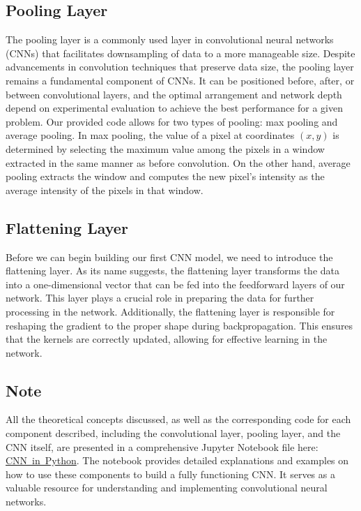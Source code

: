 \documentclass[onecolumn,10pt,cleanfoot]{asme2ej}
\begin{document}
\subsection{Pooling Layer}
The pooling layer is a commonly used layer in convolutional neural networks (CNNs) that facilitates downsampling of data to a more manageable size. Despite advancements in convolution techniques that preserve data size, the pooling layer remains a fundamental component of CNNs. It can be positioned before, after, or between convolutional layers, and the optimal arrangement and network depth depend on experimental evaluation to achieve the best performance for a given problem. Our provided code allows for two types of pooling: max pooling and average pooling. In max pooling, the value of a pixel at coordinates $(x,y)$ is determined by selecting the maximum value among the pixels in a window extracted in the same manner as before convolution. On the other hand, average pooling extracts the window and computes the new pixel's intensity as the average intensity of the pixels in that window.

\subsection{Flattening Layer}
Before we can begin building our first CNN model, we need to introduce the flattening layer. As its name suggests, the flattening layer transforms the data into a one-dimensional vector that can be fed into the feedforward layers of our network. This layer plays a crucial role in preparing the data for further processing in the network. Additionally, the flattening layer is responsible for reshaping the gradient to the proper shape during backpropagation. This ensures that the kernels are correctly updated, allowing for effective learning in the network.

\subsection{Note}
All the theoretical concepts discussed, as well as the corresponding code for each component described, including the convolutional layer, pooling layer, and the CNN itself, are presented in a comprehensive Jupyter Notebook file here: \href{https://github.com/EricEReber/CNN/blob/main/doc/CNN_in_Python.ipynb}{\color{blue}CNN\ in\ Python}. The notebook provides detailed explanations and examples on how to use these components to build a fully functioning CNN. It serves as a valuable resource for understanding and implementing convolutional neural networks.
\end{document}
